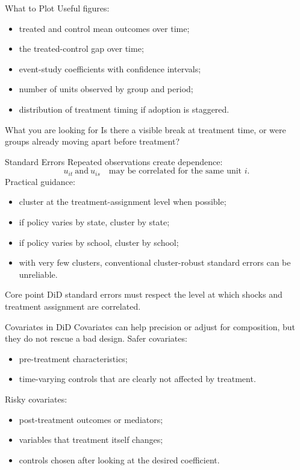 \documentclass[11pt,aspectratio=169]{beamer}
\begin{document}
\begin{frame}{What to Plot}
  Useful figures:
  \begin{itemize}
    \item treated and control mean outcomes over time;
    \item the treated-control gap over time;
    \item event-study coefficients with confidence intervals;
    \item number of units observed by group and period;
    \item distribution of treatment timing if adoption is staggered.
  \end{itemize}
  \begin{block}{What you are looking for}
    Is there a visible break at treatment time, or were groups already moving apart before treatment?
  \end{block}
\end{frame}

\begin{frame}{Standard Errors}
  Repeated observations create dependence:
  \[
    u_{it}\ \text{and}\ u_{is}
    \quad \text{may be correlated for the same unit } i.
  \]
  \vspace{0.3em}
  Practical guidance:
  \begin{itemize}
    \item cluster at the treatment-assignment level when possible;
    \item if policy varies by state, cluster by state;
    \item if policy varies by school, cluster by school;
    \item with very few clusters, conventional cluster-robust standard errors can be unreliable.
  \end{itemize}
  \begin{block}{Core point}
    DiD standard errors must respect the level at which shocks and treatment assignment are correlated.
  \end{block}
\end{frame}

\begin{frame}{Covariates in DiD}
  Covariates can help precision or adjust for composition, but they do not rescue a bad design.
  \vspace{0.3em}
  Safer covariates:
  \begin{itemize}
    \item pre-treatment characteristics;
    \item time-varying controls that are clearly not affected by treatment.
  \end{itemize}
  Risky covariates:
  \begin{itemize}
    \item post-treatment outcomes or mediators;
    \item variables that treatment itself changes;
    \item controls chosen after looking at the desired coefficient.
  \end{itemize}
\end{frame}
\end{document}
